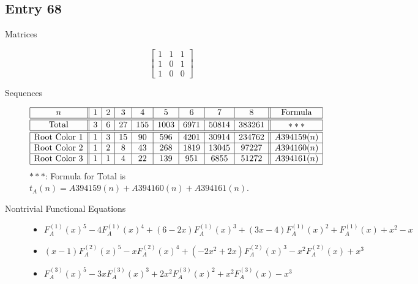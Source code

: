 \documentclass[12pt]{amsart}
\newcommand{\gff}[2]{F_{#2}^{(#1)}(x)}
\newcommand{\gfa}[1]{\gff{#1}{A}}
\begin{document}
\subsection*{Entry 68}
\begin{description}
    \item[Matrices]
    
    \[\begin{bmatrix}
1 & 1 & 1 \\
1 & 0 & 1 \\
1 & 0 & 0
\end{bmatrix}\]
    \item[Sequences]\hspace*{\fill}\vspace{-0.5cm}
    \begin{center}
        \[
        \begin{array}{|c||c|c|c|c|c|c|c|c||c|}\hline
           n  & 1 & 2 & 3 & 4 & 5 & 6 & 7 & 8  & \text{Formula}\\\hline\hline
           \text{Total}  & 3 & 6 & 27 & 155 & 1003 & 6971 & 50814 & 383261 & *** \\\hline\hline
           \text{Root Color }1 & 1 & 3 & 15 & 90 & 596 & 4201 & 30914 & 234762 & A394159(n) \\\hline
           \text{Root Color }2 & 1 & 2 & 8 & 43 & 268 & 1819 & 13045 & 97227 & A394160(n) \\\hline
           \text{Root Color }3 & 1 & 1 & 4 & 22 & 139 & 951 & 6855 & 51272 & A394161(n) \\\hline
        \end{array}
        \]
        $***$: Formula for Total is $t_A(n)=A394159(n)+A394160(n)+A394161(n)$.
    \end{center}
    
    \item[Nontrivial Functional Equations]\hspace*{\fill}

    \begin{itemize}
\item $\gfa{1}^5-4\gfa{1}^4+(6 - 2x)\gfa{1}^3+(3x - 4)\gfa{1}^2+\gfa{1}+x^2 - x$


\item $(x - 1)\gfa{2}^5-x\gfa{2}^4+(-2x^2 + 2x)\gfa{2}^3-x^2\gfa{2}+x^3$

\item $\gfa{3}^5-3x\gfa{3}^3+2x^2\gfa{3}^2+x^2\gfa{3}-x^3$


\end{itemize}
    
\end{description}
\end{document}
